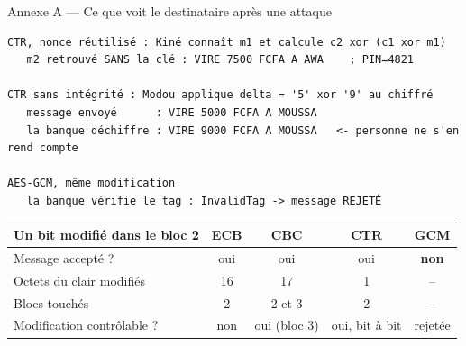 \documentclass[aspectratio=169,10pt]{beamer}
\begin{document}
\iffalse
\appendix

\begin{frame}[fragile]{Annexe A --- Ce que voit le destinataire après une attaque}
  \scriptsize
\begin{verbatim}
CTR, nonce réutilisé : Kiné connaît m1 et calcule c2 xor (c1 xor m1)
   m2 retrouvé SANS la clé : VIRE 7500 FCFA A AWA    ; PIN=4821

CTR sans intégrité : Modou applique delta = '5' xor '9' au chiffré
   message envoyé      : VIRE 5000 FCFA A MOUSSA
   la banque déchiffre : VIRE 9000 FCFA A MOUSSA   <- personne ne s'en rend compte

AES-GCM, même modification
   la banque vérifie le tag : InvalidTag -> message REJETÉ
\end{verbatim}
  \centering
  \begin{tabular}{lcccc}
    \toprule
    Un bit modifié dans le bloc 2 & ECB & CBC & CTR & GCM \\
    \midrule
    Message accepté ? & oui & oui & oui & \textcolor{espgreen}{\textbf{non}} \\
    Octets du clair modifiés & 16 & 17 & 1 & -- \\
    Blocs touchés & 2 & 2 et 3 & 2 & -- \\
    Modification contrôlable ? & non & oui (bloc 3) & \textcolor{espred}{oui, bit à bit} & rejetée \\
    \bottomrule
  \end{tabular}
\end{frame}
\end{document}
